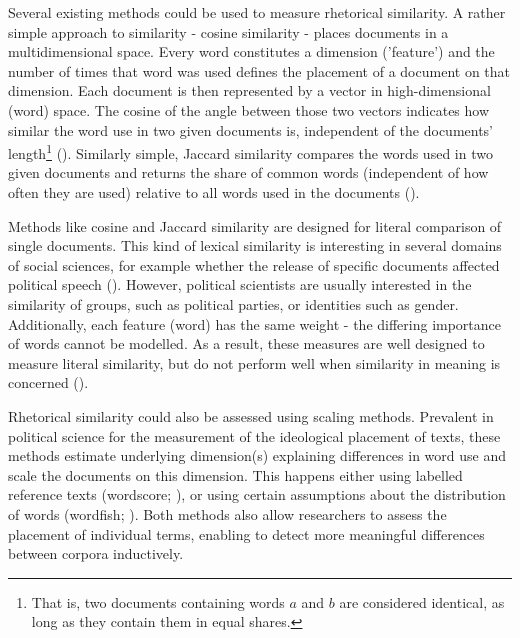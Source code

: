 \documentclass{article}
\begin{document}
Several existing methods could be used to measure rhetorical similarity. A rather simple approach to similarity - cosine similarity - places documents in a multidimensional space. Every word constitutes a dimension ('feature') and the number of times that word was used defines the placement of a document on that dimension. Each document is then represented by a vector in high-dimensional (word) space. The cosine of the angle between those two vectors indicates how similar the word use in two given documents is, independent of the documents' length\footnote{That is, two documents containing words $a$ and $b$ are considered identical, as long as they contain them in equal shares.} (\cite{Similarity2007a}).  Similarly simple, Jaccard similarity compares the words used in two given documents and returns the share of common words (independent of how often they are used) relative to all words used in the documents (\cite{Jaccard1912}).\par

Methods like cosine and Jaccard similarity are designed for literal comparison of single documents. This kind of lexical similarity is interesting in several domains of social sciences, for example whether the release of specific documents affected political speech (\cite{Similarity2007a, Hager2020}). However, political scientists are usually interested in the similarity of groups, such as political parties, or identities such as gender. Additionally, each feature (word) has the same weight - the differing importance of words cannot be modelled. As a result, these measures are well designed to measure literal similarity, but do not perform well when similarity in meaning is concerned (\cite{Prasetya2018}).\par

Rhetorical similarity could also be assessed using scaling methods. Prevalent in political science for the measurement of the ideological placement of texts, these methods estimate underlying dimension(s) explaining differences in word use and scale the documents on this dimension. This happens either using labelled reference texts (wordscore; \cite{Laver2003}), or using certain assumptions about the distribution of words (wordfish; \cite{Slapin2008}). Both methods also allow researchers to assess the placement of individual terms, enabling to detect more meaningful differences between corpora inductively. \par
\end{document}
